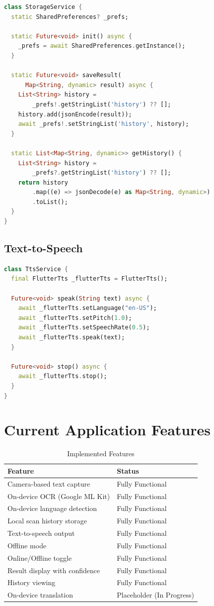 \documentclass[12pt,a4paper]{report}
\begin{document}
\begin{lstlisting}[language=Dart]
class StorageService {
  static SharedPreferences? _prefs;
  
  static Future<void> init() async {
    _prefs = await SharedPreferences.getInstance();
  }
  
  static Future<void> saveResult(
      Map<String, dynamic> result) async {
    List<String> history = 
        _prefs!.getStringList('history') ?? [];
    history.add(jsonEncode(result));
    await _prefs!.setStringList('history', history);
  }
  
  static List<Map<String, dynamic>> getHistory() {
    List<String> history = 
        _prefs?.getStringList('history') ?? [];
    return history
        .map((e) => jsonDecode(e) as Map<String, dynamic>)
        .toList();
  }
}
\end{lstlisting}

\section{Text-to-Speech}

\begin{lstlisting}[language=Dart]
class TtsService {
  final FlutterTts _flutterTts = FlutterTts();
  
  Future<void> speak(String text) async {
    await _flutterTts.setLanguage("en-US");
    await _flutterTts.setPitch(1.0);
    await _flutterTts.setSpeechRate(0.5);
    await _flutterTts.speak(text);
  }
  
  Future<void> stop() async {
    await _flutterTts.stop();
  }
}
\end{lstlisting}

\chapter{Current Application Features}

\begin{table}[H]
\centering
\caption{Implemented Features}
\begin{tabular}{|p{6cm}|p{5cm}|}
\hline
\textbf{Feature} & \textbf{Status} \\ \hline
Camera-based text capture & Fully Functional \\ \hline
On-device OCR (Google ML Kit) & Fully Functional \\ \hline
On-device language detection & Fully Functional \\ \hline
Local scan history storage & Fully Functional \\ \hline
Text-to-speech output & Fully Functional \\ \hline
Offline mode & Fully Functional \\ \hline
Online/Offline toggle & Fully Functional \\ \hline
Result display with confidence & Fully Functional \\ \hline
History viewing & Fully Functional \\ \hline
On-device translation & Placeholder (In Progress) \\ \hline
\end{tabular}
\end{table}
\end{document}
